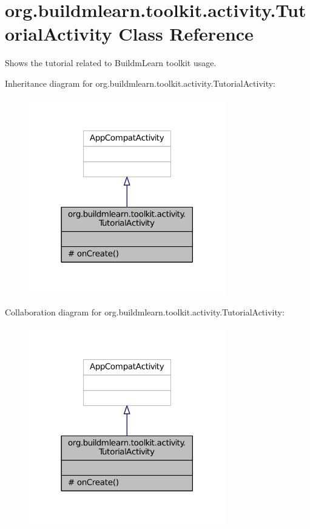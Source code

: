 \hypertarget{classorg_1_1buildmlearn_1_1toolkit_1_1activity_1_1TutorialActivity}{\section{org.\-buildmlearn.\-toolkit.\-activity.\-Tutorial\-Activity Class Reference}
\label{classorg_1_1buildmlearn_1_1toolkit_1_1activity_1_1TutorialActivity}
}


Shows the tutorial related to Buildm\-Learn toolkit usage.  




Inheritance diagram for org.\-buildmlearn.\-toolkit.\-activity.\-Tutorial\-Activity\-:
\nopagebreak
\begin{figure}[H]
\begin{center}
\leavevmode
\includegraphics[width=242pt]{d0/dcb/classorg_1_1buildmlearn_1_1toolkit_1_1activity_1_1TutorialActivity__inherit__graph}
\end{center}
\end{figure}


Collaboration diagram for org.\-buildmlearn.\-toolkit.\-activity.\-Tutorial\-Activity\-:
\nopagebreak
\begin{figure}[H]
\begin{center}
\leavevmode
\includegraphics[width=242pt]{db/da3/classorg_1_1buildmlearn_1_1toolkit_1_1activity_1_1TutorialActivity__coll__graph}
\end{center}
\end{figure}
